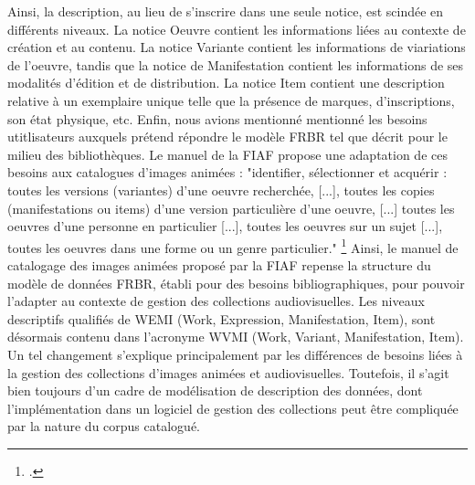 Ainsi, la description, au lieu de s'inscrire dans une seule notice, est scindée en différents niveaux. La notice Oeuvre contient les informations liées au contexte de création et au contenu. La notice Variante contient les informations de viariations de l'oeuvre, tandis que la notice de Manifestation contient les informations de ses modalités d'édition et de distribution. La notice Item contient une description relative à un exemplaire unique telle que la présence de marques, d'inscriptions, son état physique, etc.
Enfin, nous avions mentionné mentionné les besoins utitlisateurs auxquels prétend répondre le modèle FRBR tel que décrit pour le milieu des bibliothèques. Le manuel de la FIAF propose une adaptation de ces besoins aux catalogues d'images animées : "identifier, sélectionner et acquérir : toutes les versions (variantes) d'une oeuvre recherchée, [...], toutes les copies (manifestations ou items) d'une version particulière d'une oeuvre, [...] toutes les oeuvres d'une personne en particulier [...], toutes les oeuvres sur un sujet [...], toutes les oeuvres dans une forme ou un genre particulier." \footcite{zotero-item-646}
Ainsi, le manuel de catalogage des images animées proposé par la FIAF repense la structure du modèle de données FRBR, établi pour des besoins bibliographiques, pour pouvoir l'adapter au contexte de gestion des collections audiovisuelles. Les niveaux descriptifs qualifiés de WEMI (Work, Expression, Manifestation, Item), sont désormais contenu dans l'acronyme WVMI (Work, Variant, Manifestation, Item). Un tel changement s'explique principalement par les différences de besoins liées à la gestion des collections d'images animées et audiovisuelles. Toutefois, il s'agit bien toujours d'un cadre de modélisation de description des données, dont l'implémentation dans un logiciel de gestion des collections peut être compliquée par la nature du corpus catalogué. 



%


